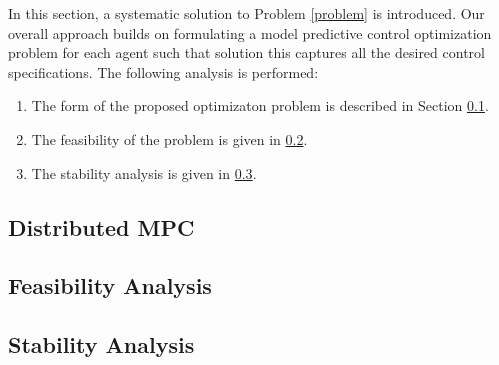 In this section, a systematic solution to Problem \ref{problem} is introduced.
Our overall approach builds on formulating a model predictive control
optimization problem for each agent such that solution this captures all
the desired control specifications. The following analysis is performed:

\begin{enumerate}
	\item The form of the proposed optimizaton problem is described in Section \ref{sec:distributed_mpc}.
	\item The feasibility of the problem is given in \ref{sec:feasibility_analysis}.
	\item The stability analysis is given in \ref{sec:stability_analysis}.
\end{enumerate}

\subsection{Distributed MPC} \label{sec:distributed_mpc}

\subsection{Feasibility Analysis} \label{sec:feasibility_analysis}

\subsection{Stability Analysis} \label{sec:stability_analysis}
